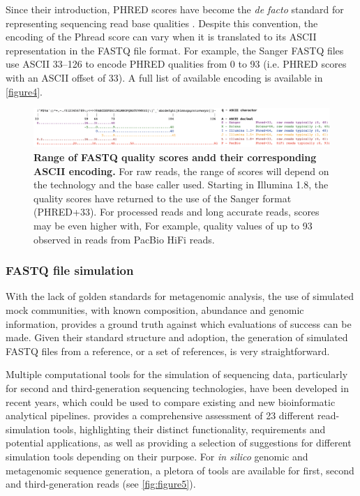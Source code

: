 Since their introduction, PHRED scores have become the \textit{de facto} standard for representing sequencing read base qualities \citep{cock_sanger_2010}. Despite this convention, the encoding of the Phread score can vary when it is translated to its ASCII representation in the FASTQ file format. For example, the Sanger FASTQ files use ASCII 33–126 to encode PHRED qualities from 0 to 93 (i.e. PHRED scores with an ASCII offset of 33). A full list of available encoding is available in \ref{figure4}. 

\begin{figure}[h!]
\centering
\includegraphics[width=\textwidth]{figures/introduction/Figure 4.png}
\caption{\textbf{Range of FASTQ quality scores andd their corresponding ASCII encoding.} For raw reads, the range of scores will depend on the technology and the base caller used. Starting in Illumina 1.8, the quality scores have returned to the use of the Sanger format (PHRED+33). For processed reads and long accurate reads, scores may be even higher with, For example, quality values of up to 93 observed in reads from PacBio HiFi reads.}
\label{fig:figure4}
\end{figure}

\subsubsection{FASTQ file simulation}

With the lack of golden standards for metagenomic analysis, the use of simulated mock communities, with known composition, abundance and genomic information, provides a ground truth against which evaluations of success can be made. Given their standard structure and adoption, the generation of simulated FASTQ files from a reference, or a set of references, is very straightforward. 

Multiple computational tools for the simulation of sequencing data, particularly for second and third-generation sequencing technologies, have been developed in recent years, which could be used to compare existing and new bioinformatic analytical pipelines. \cite{escalona_comparison_2016} provides a comprehensive assessment of 23 different read-simulation tools,  highlighting their distinct functionality, requirements and potential applications, as well as providing a selection of suggestions for different simulation tools depending on their purpose. For \textit{in silico} genomic and metagenomic sequence generation, a pletora of tools are available for first, second and third-generation reads (see \ref{fig:figure5}).

